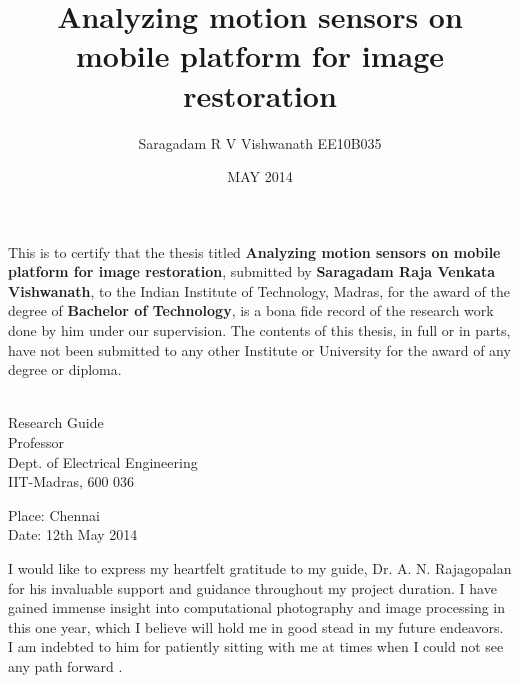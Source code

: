 \documentclass[BTech]{iitmdiss}
\begin{document}
\title{Analyzing motion sensors on mobile platform for image restoration}
\author{\hspace{35pt} Saragadam R V Vishwanath \newline EE10B035}
\date{MAY 2014}
\maketitle
\pagebreak

\certificate

\vspace*{0.5in}

\noindent This is to certify that the thesis titled {\bf Analyzing
 motion sensors on mobile platform for image restoration}, submitted by
  {\bf Saragadam Raja Venkata Vishwanath}, 
  to the Indian Institute of Technology, Madras, for
the award of the degree of {\bf Bachelor of Technology}, is a bona fide
record of the research work done by him under our supervision.  The
contents of this thesis, in full or in parts, have not been submitted
to any other Institute or University for the award of any degree or
diploma.

\vspace*{1.5in}

\begin{singlespacing}
\hspace*{-0.25in}
\parbox{2.5in}{
 \\
\noindent Research Guide \\ 
\noindent Professor \\
\noindent Dept. of Electrical Engineering\\
\noindent IIT-Madras, 600 036 \\
} 
\hspace*{1.0in} 
\end{singlespacing}
\vspace*{0.25in}
\noindent Place: Chennai\\
Date: 12th May 2014

\pagebreak

\acknowledgements

I would like to express my heartfelt gratitude to my guide, 
Dr. A. N. Rajagopalan for his invaluable support and guidance throughout
my project duration. I have gained immense insight into computational
photography and image processing in this one year, which I believe will 
hold me in good stead in my future endeavors. I am indebted to him for
patiently sitting with me at times when I could not see any path forward
. 
\end{document}
